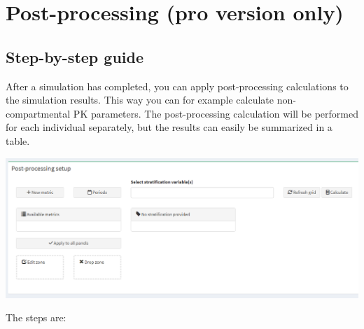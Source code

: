 \documentclass[
]{book}
\begin{document}
\chapter{Post-processing (pro version only)}\label{post-processing-pro-version-only}

\section{Step-by-step guide}\label{step-by-step-guide}

After a simulation has completed, you can apply post-processing calculations to the simulation results. This way you can for example calculate non-compartmental PK parameters. The post-processing calculation will be performed for each individual separately, but the results can easily be summarized in a table.

\includegraphics[width=6.54167in,height=\textheight]{pictures/Post_processing1.png}

The steps are:
\end{document}

